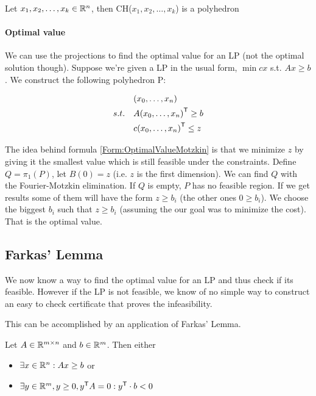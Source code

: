 \begin{cor} Let $x_1,x_2,\ldots, x_k \in \mathbb{R}^n$, then CH($x_1,x_2,\ldots, x_k$) is a polyhedron\end{cor}

\paragraph*{Optimal value} We can use the projections to find the optimal value for an LP (not the optimal solution though). Suppose we're given a LP in the usual form, $\min cx$ s.t. $Ax\geq b$. We construct the following polyhedron P:

\begin{align}  \notag
 & (x_0,\ldots,x_n)  \\ \notag
s.t.\quad & A{(x_0,\ldots,x_n)}^\text{\upshape \sffamily T} \geq b \\
& c{(x_0,\ldots,x_n)}^\text{\upshape \sffamily T}  \leq z \label{Form:OptimalValueMotzkin}
\end{align}

The idea behind formula \ref{Form:OptimalValueMotzkin} is that we minimize $z$ by giving it the smallest value which is still feasible under the constraints.
Define $Q = \pi_1(P)$, let $B(0)=z$ (i.e. $z$ is the first dimension). We can find $Q$ with the Fourier-Motzkin elimination. If $Q$ is empty, $P$ has no feasible region. If we get results some of them will have the form $z \geq b_i$ (the other ones $0 \geq b_i$). We choose the biggest $b_i$ such that $z \geq b_i$ (assuming the our goal was to minimize the cost). That is the optimal value. 

\subsection{Farkas' Lemma}
We now know a way to find the optimal value for an LP and thus check if its feasible. However if the LP is not feasible, we know of no simple way to construct an easy to check certificate that proves the infeasibility.

This can be accomplished by an application of Farkas' Lemma.

\begin{thm} Let $A\in \mathbb{R}^{m\times n}$ and $b\in \mathbb{R}^m$. Then either 
\begin{itemize}
\item $\exists x\in \mathbb{R}^n: Ax\geq b$ or
\item $\exists y\in \mathbb{R}^m, y\geq 0, {y}^\text{\upshape \sffamily T} A=0: {y}^\text{\upshape \sffamily T} \cdot b<0$
\end{itemize}
\end{thm} 

